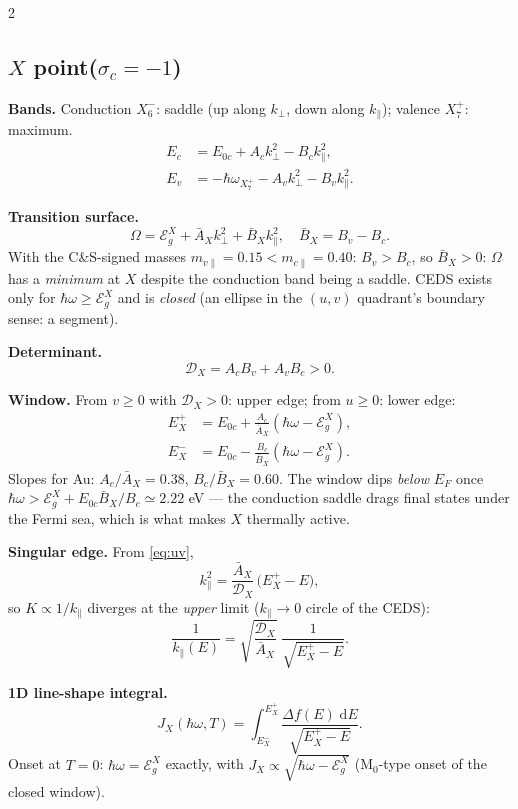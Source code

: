 \documentclass[11pt,a4paper]{article}
\numberwithin{equation}{section}
\newcommand{\hw}{\hbar\omega}
\newcommand{\EgX}{\mathcal{E}_g^{X}}
\newcommand{\cD}{\mathcal{D}}
\newcommand{\Ab}{\bar{A}}
\newcommand{\Bb}{\bar{B}}
\newcommand{\kperp}{k_{\perp}}
\newcommand{\kpar}{k_{\parallel}}
\newcommand{\dd}{\mathrm{d}}
\newcommand{\Ec}{E_c}
\newcommand{\Ev}{E_v}
\newcommand{\Ezc}{E_{0c}}
\begin{document}
\setlength{\columnseprule}{0.4pt}
\begin{paracol}{2}

\begin{leftcolumn}
\subsection*{$X$ point\quad ($\sigma_c=-1$)}

\textbf{Bands.} Conduction $X_6^-$: saddle
(up along $\kperp$, down along $\kpar$); valence $X_7^+$: maximum.
\begin{align*}
\Ec&=\Ezc+A_c\kperp^2-B_c\kpar^2,\\
\Ev&=-\hbar\omega_{X_7^+}-A_v\kperp^2-B_v\kpar^2 .
\end{align*}

\textbf{Transition surface.}
\[
\Omega=\EgX+\Ab_X\kperp^2+\Bb_X\kpar^2,\quad
\Bb_X=B_v-B_c .
\]
With the C\&S-signed masses $m_{v\parallel}\!=\!0.15<m_{c\parallel}\!=\!0.40$:
$B_v>B_c$, so $\Bb_X>0$: $\Omega$ has a \emph{minimum} at $X$ despite
the conduction band being a saddle.  CEDS exists only for
$\hw\ge\EgX$ and is \emph{closed} (an ellipse in the $(u,v)$
quadrant's boundary sense: a segment).

\textbf{Determinant.}
\[
\cD_X=A_cB_v+A_vB_c>0 .
\]

\textbf{Window.}  From $v\ge0$ with $\cD_X>0$: upper edge; from
$u\ge0$: lower edge:
\begin{align*}
E^{+}_X&=\Ezc+\frac{A_c}{\Ab_X}(\hw-\EgX),\\
E^{-}_X&=\Ezc-\frac{B_c}{\Bb_X}(\hw-\EgX).
\end{align*}
Slopes for Au: $A_c/\Ab_X=0.38$, $B_c/\Bb_X=0.60$.  The window dips
\emph{below} $E_F$ once $\hw>\EgX+\Ezc\Bb_X/B_c\simeq2.22$ eV --- the
conduction saddle drags final states under the Fermi sea, which is
what makes $X$ thermally active.

\textbf{Singular edge.}  From \eqref{eq:uv},
\[
\kpar^{2}=\frac{\Ab_X}{\cD_X}\,\bigl(E^{+}_X-E\bigr),
\]
so $K\propto1/\kpar$ diverges at the \emph{upper} limit
($\kpar\to0$ circle of the CEDS):
\[
\frac{1}{\kpar(E)}=\sqrt{\frac{\cD_X}{\Ab_X}}\;
\frac{1}{\sqrt{E^{+}_X-E}} .
\]

\textbf{1D line-shape integral.}
\[
J_X(\hw,T)=\int_{E^{-}_X}^{E^{+}_X}
\frac{\Delta f(E)\;\dd E}{\sqrt{E^{+}_X-E}} .
\]
Onset at $T=0$: $\hw=\EgX$ exactly, with
$J_X\propto\sqrt{\hw-\EgX}$ (M$_0$-type onset of the closed window).
\end{leftcolumn}


\end{paracol}
\end{document}
